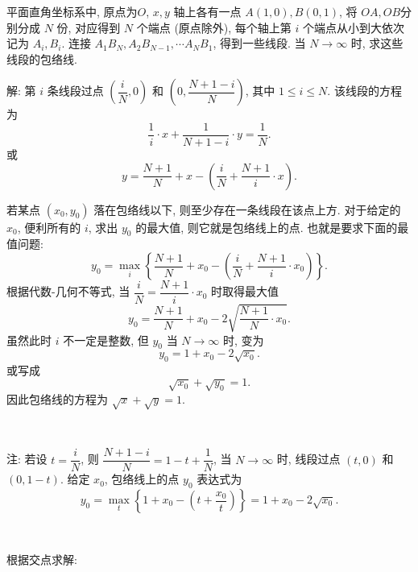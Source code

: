 平面直角坐标系中, 原点为$O$, $x,y$ 轴上各有一点 $A(1,0), B(0,1)$, 将 $OA,OB$分别分成 $N$ 份, 对应得到 $N$ 个端点 (原点除外), 每个轴上第 $i$ 个端点从小到大依次记为 $A_i, B_i$. 连接 $A_1B_N, A_2B_{N-1}, \cdots A_NB_1$, 得到一些线段. 当 $N\to\infty$ 时, 求这些线段的包络线.
\begin{figure*}[htbp]
\centering
{}
\end{figure*}

解: 第 $i$ 条线段过点 $(\dfrac{i}{N}, 0)$ 和 $(0, \dfrac{N+1-i}{N})$, 其中 $1\le i\le N$. 该线段的方程为
\[\frac{1}{i}\cdot x + \frac{1}{N+1-i}\cdot y=\frac{1}{N}.\]
或
\[y=\frac{N+1}{N} + x - \left(\frac{i}{N} + \frac{N+1}{i}\cdot x\right).\]

若某点 $(x_0,y_0)$ 落在包络线以下, 则至少存在一条线段在该点上方. 对于给定的 $x_0$, 便利所有的 $i$, 求出 $y_0$ 的最大值, 则它就是包络线上的点. 也就是要求下面的最值问题:
\[y_0 = \mathop{\max}_i \left\{ \frac{N+1}{N} + x_0 - \left(\frac{i}{N} + \frac{N+1}{i}\cdot x_0\right) \right\} .\]
根据代数-几何不等式, 当 $\dfrac{i}{N} = \dfrac{N+1}{i}\cdot x_0$ 时取得最大值
\[ y_0 = \frac{N+1}{N} + x_0 - 2\sqrt{\frac{N+1}{N}\cdot x_0} .\]
虽然此时 $i$ 不一定是整数, 但 $y_0$ 
当 $N\to\infty$ 时, 变为
\[y_0 = 1 + x_0 - 2\sqrt{x_0} .\]
或写成
\[\sqrt{x_0}+\sqrt{y_0} = 1.\]
因此包络线的方程为 $\sqrt{x}+\sqrt{y}=1$.

~

注: 若设 $t = \dfrac{i}{N}$, 则 $\dfrac{N+1-i}{N} = 1 - t + \dfrac{1}{N}$, 当 $N\to\infty$ 时, 线段过点 $(t,0)$ 和 $(0,1-t)$. 给定 $x_0$, 包络线上的点 $y_0$ 表达式为
\[ y_0 = \mathop{\max}_t\left\{ 1+x_0 - (t+\frac{x_0}{t}) \right\} = 1 + x_0 - 2\sqrt{x_0} .\]


~

\noindent 根据交点求解: 

